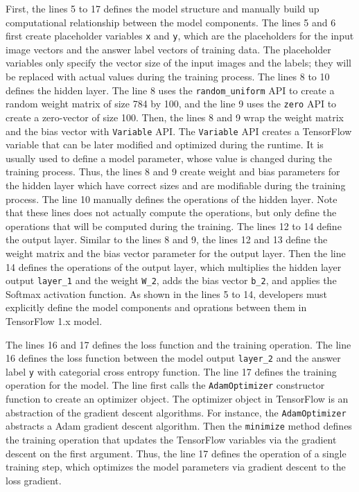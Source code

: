 First, the lines 5 to 17 defines the model structure and manually build up
computational relationship between the model components.
The lines 5 and 6 first create placeholder variables {\tt x} and {\tt y},
which are the placeholders for the input image vectors 
and the answer label vectors of training data.
The placeholder variables only specify the vector size of the input images
and the labels; they will be replaced with actual values during the training
process. 
The lines 8 to 10 defines the hidden layer.
The line 8 uses the {\tt random\_uniform} API to create 
a random weight matrix of size 784 by 100, 
and the line 9 uses the {\tt zero} API to create a zero-vector of size 100.
Then, the lines 8 and 9 wrap the weight matrix and the bias vector with
{\tt Variable} API.
The {\tt Variable} API creates a TensorFlow variable that can be later modified
and optimized during the runtime. It is usually used to define a model 
parameter, whose value is changed during the training process.
Thus, the lines 8 and 9 create weight and bias parameters for the
hidden layer which have correct sizes and are modifiable during the 
training process.
The line 10 manually defines the operations of the hidden layer. 
Note that these lines does not actually compute the operations,
but only define the operations that will be computed during the training.
The lines 12 to 14 define the output layer.
Similar to the lines 8 and 9, the lines 12 and 13 define the weight matrix
and the bias vector parameter for the output layer.
Then the line 14 defines the operations of the output layer,
which multiplies the hidden layer output {\tt layer\_1} and
the weight {\tt W\_2}, adds the bias vector {\tt b\_2}, and applies the
Softmax activation function.
As shown in the lines 5 to 14, developers must explicitly define
the model components and oprations between them in TensorFlow 1.x model.

The lines 16 and 17 defines the loss function and the training operation. 
The line 16 defines the loss function between the model output {\tt layer\_2} 
and the answer label {\tt y} with categorial cross entropy function.
The line 17 defines the training operation for the model.
The line first calls the {\tt AdamOptimizer} constructor
function to create an optimizer object.
The optimizer object in TensorFlow is an abstraction of the gradient
descent algorithms.
For instance, the {\tt AdamOptimizer} abstracts a Adam gradient descent
algorithm. %
Then the {\tt minimize} method defines the training operation that updates the
TensorFlow variables via the gradient descent on the first argument.
Thus, the line 17 defines the operation of a single training step,
which optimizes the model parameters via gradient descent to the loss gradient.

